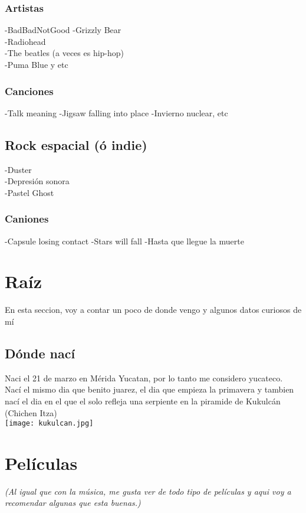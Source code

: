 \documentclass[12pt,a4paper]{article}
\begin{document}
\subsubsection*{Artistas} 
-BadBadNotGood
-Grizzly Bear\\
-Radiohead\\
-The beatles (a veces es hip-hop)\\ 
-Puma Blue 
y etc\\ 
\subsubsection*{Canciones}
-Talk meaning
-Jigsaw falling into place 
-Invierno nuclear, etc \\
\subsection*{Rock espacial (ó indie) }
-Duster\\
-Depresión sonora\\
-Pastel Ghost\\
\subsubsection*{Caniones}
-Capsule losing contact
-Stars will fall 
-Hasta que llegue la muerte\\
\section*{Raíz}
En esta seccion, voy a contar un poco de donde vengo y algunos datos curiosos de mí\\
\subsection*{Dónde nací}
Naci el 21 de marzo en Mérida Yucatan, por lo tanto me considero yucateco.\\ %
Nací el mismo dia que benito juarez, el dia que empieza la primavera y tambien nací el dia en el que el solo refleja una serpiente en la piramide de Kukulcán (Chichen Itza)\\

\texttt{[image: kukulcan.jpg]}\\



\section*{Películas}
{\it{(Al igual que con la música, me gusta ver de todo tipo de películas y aqui voy a recomendar algunas que esta buenas.)}}
\end{document}
